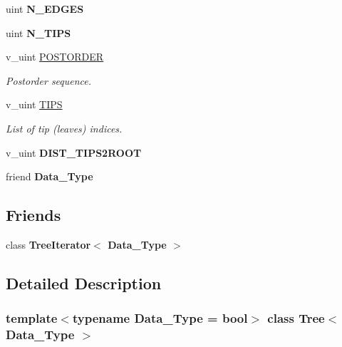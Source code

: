 \begin{DoxyCompactItemize}
\mbox{\label{classTree_a6fb2f14930ed6307144de128337bc556}} 
uint {\bfseries N\+\_\+\+E\+D\+G\+ES}
\item 
\mbox{\label{classTree_a348ebe989553464a4f09f12c4b20f932}} 
uint {\bfseries N\+\_\+\+T\+I\+PS}
\item 
v\+\_\+uint \hyperlink{classTree_a9cef7f2ba6064b21ce62ab2e7292332a}{P\+O\+S\+T\+O\+R\+D\+ER}
\begin{DoxyCompactList}\small\item\em Postorder sequence. \end{DoxyCompactList}\item 
\mbox{\label{classTree_a69c7c17b991425291a9eaf337c5fa293}} 
v\+\_\+uint \hyperlink{classTree_a69c7c17b991425291a9eaf337c5fa293}{T\+I\+PS}
\begin{DoxyCompactList}\small\item\em List of tip (leaves) indices. \end{DoxyCompactList}\item 
\mbox{\label{classTree_abf908fc86a7b2a44462c6ccf8b16f9f2}} 
v\+\_\+uint {\bfseries D\+I\+S\+T\+\_\+\+T\+I\+P\+S2\+R\+O\+OT}
\item 
\mbox{\label{classTree_a7eab5b0af0f7e7c02e48ac3a95accb2f}} 
friend {\bfseries Data\+\_\+\+Type}
\end{DoxyCompactItemize}
\subsection*{Friends}
\begin{DoxyCompactItemize}
\item 
\mbox{\label{classTree_af28004756940ce663afb7015ce6136e9}} 
class {\bfseries Tree\+Iterator$<$ Data\+\_\+\+Type $>$}
\end{DoxyCompactItemize}


\subsection{Detailed Description}
\subsubsection*{template$<$typename Data\+\_\+\+Type = bool$>$\newline
class Tree$<$ Data\+\_\+\+Type $>$}


